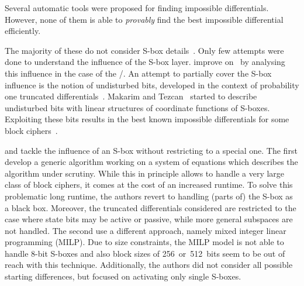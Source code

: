 Several automatic tools were proposed for finding impossible differentials.
However, none of them is able to \emph{provably} find the best impossible differential efficiently.

The majority of these do not consider S-box details~.
Only few attempts were done to understand the influence of the S-box layer.
\textcite{DCC:WanJin17} improve on~\cite{EC:SLGRL16} by analysing this influence in the case of the \AES/.
An attempt to partially cover the S-box influence is the notion of undisturbed bits, developed in the context of probability one truncated differentials~\cite{CAM:Tezcan14}.
Makarim and Tezcan~\cite{LIGHTSEC:MakTez14} started to describe undisturbed bits with linear structures of coordinate functions of S-boxes.
Exploiting these bits results in the best known impossible differentials for some block ciphers~.

\textcite{C:DerFou16} and \textcite{EC:SasTod17} tackle the influence of an S-box without restricting to a special one.
The first develop a generic algorithm working on a system of equations which describes the algorithm under scrutiny.
While this in principle allows to handle a very large class of block ciphers, it comes at the cost of an increased runtime.
To solve this problematic long runtime, the authors revert to handling (parts of) the S-box as a black box.
Moreover, the truncated differentials considered are restricted to the case where state bits may be active or passive, while more general subspaces are not handled.
The second use a different approach, namely mixed integer linear programming (MILP).
Due to size constraints, the MILP model is not able to handle 8-bit S-boxes and also block sizes of 256~or~512~bits seem to be out of reach with this technique.
Additionally, the authors did not consider all possible starting differences, but focused on activating only single S-boxes.

